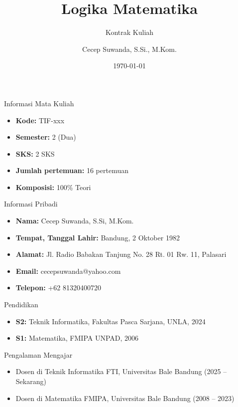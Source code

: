 \documentclass[handout]{beamer}
\title{Logika Matematika}
\subtitle{Kontrak Kuliah}
\author{Cecep Suwanda, S.Si., M.Kom.}
\institute{Universitas Bale Bandung}
\date{\today}
\begin{document}
	
	\begin{frame}
		\titlepage
	\end{frame}
	
	\begin{frame}{Informasi Mata Kuliah}
		\begin{itemize}
			\item \textbf{Kode:} TIF-xxx
			\item \textbf{Semester:} 2 (Dua)
			\item \textbf{SKS:} 2 SKS
			\item \textbf{Jumlah pertemuan:} 16 pertemuan
			\item \textbf{Komposisi:} 100\% Teori
		\end{itemize}
	\end{frame}
	
	\begin{frame}{Informasi Pribadi}
		
		\begin{itemize}
			\item \textbf{Nama:} Cecep Suwanda, S.Si, M.Kom.
			\item \textbf{Tempat, Tanggal Lahir:} Bandung, 2 Oktober 1982
			\item \textbf{Alamat:} Jl. Radio Babakan Tanjung No. 28 Rt. 01 Rw. 11, Palasari
			\item \textbf{Email:} cecepsuwanda@yahoo.com
			\item \textbf{Telepon:} +62 81320400720
		\end{itemize}
	\end{frame}
	
	\begin{frame}{Pendidikan}
		\begin{itemize}
			\item \textbf{S2:} Teknik Informatika, Fakultas Pasca Sarjana, UNLA, 2024
			\item \textbf{S1:} Matematika, FMIPA UNPAD, 2006
		\end{itemize}
	\end{frame}
	
	\begin{frame}{Pengalaman Mengajar}
		\begin{itemize}
			\item Dosen di Teknik Informatika FTI, Universitas Bale Bandung (2025 -- Sekarang)
			\item Dosen di Matematika FMIPA, Universitas Bale Bandung (2008 -- 2023)
		\end{itemize}
	\end{frame}
\end{document}
